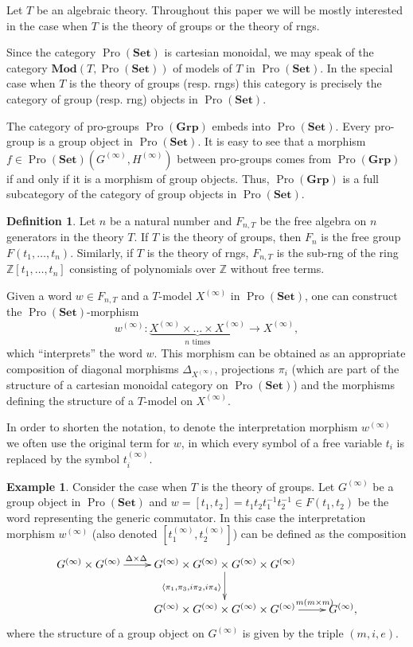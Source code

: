 \documentclass[oneside, 11pt]{amsart}
\numberwithin{equation}{section}
\theoremstyle{definition}
\newtheorem{df}[lemma]{Definition} \Crefname{df}{Definition}{Definitions}
\newtheorem{example}[lemma]{Example} \Crefname{example}{Example}{Examples}
\theoremstyle{remark}
\DeclareMathOperator{\Pro}{Pro}
\newcommand{\Set}{\mathbf{Set}}
\newcommand{\Group}{\mathbf{Grp}}
\newcommand{\Mod}{\mathbf{Mod}}
\begin{document}
Let $T$ be an algebraic theory. Throughout this paper we will be mostly interested in the case when $T$ is the theory of groups or the theory of rngs.

Since the category $\Pro(\Set)$ is cartesian monoidal, we may speak of the category $\Mod(T, \Pro(\Set))$ of models of $T$ in \(\Pro(\Set)\).
In the special case when $T$ is the theory of groups (resp. rngs) this category is precisely the category of group (resp. rng) objects in $\Pro(\Set)$.

The category of pro-groups \(\Pro(\Group)\) embeds into \(\Pro(\Set)\). Every pro-group is a group object in \(\Pro(\Set)\). It is easy to see that a morphism \(f \in \Pro(\Set)(G^{(\infty)}, H^{(\infty)})\) between pro-groups comes from \(\Pro(\Group)\) if and only if it is a morphism of group objects. Thus, $\Pro(\Group)$ is a full subcategory of the category of group objects in $\Pro(\Set)$.

\begin{df} \label{df-pro-set-morphisms} 
 Let $n$ be a natural number and $F_{n, T}$ be the free algebra on $n$ generators in the theory $T$.
 If $T$ is the theory of groups, then $F_n$ is the free group $F(t_1,\ldots, t_n)$.
 Similarly, if $T$ is the theory of rngs, $F_{n, T}$ is the sub-rng of the ring $\mathbb{Z}[t_1,\ldots, t_n]$ consisting of polynomials over $\mathbb{Z}$ without free terms.
 
 Given a word $w \in F_{n, T}$ and a $T$-model $X^{(\infty)}$ in $\Pro(\Set)$, one can construct the $\Pro(\Set)$-morphism
 \[ w^{(\infty)} \colon \underbrace{X^{(\infty)} \times \ldots \times X^{(\infty)}}_{n\text{ times}} \to X^{(\infty)}, \]
 which ``interprets'' the word $w$. This morphism can be obtained as an appropriate composition of diagonal morphisms $\Delta_{X^{(\infty)}}$, projections $\pi_i$ 
 (which are part of the structure of a cartesian monoidal category on $\Pro(\Set)$) 
 and the morphisms defining the structure of a $T$-model on $X^{(\infty)}$.
 
 In order to shorten the notation, to denote the interpretation morphism $w^{(\infty)}$ we often use the original term for $w$, in which every symbol of a free variable $t_i$ is replaced by the symbol $t_i^{(\infty)}$.
\end{df}

\begin{example}\label{example-commutator}
Consider the case when $T$ is the theory of groups.
Let $G^{(\infty)}$ be a group object in $\Pro(\Set)$ and $w = [t_1, t_2] = t_1 t_2 t_1^{-1} t_2^{-1} \in F(t_1, t_2)$ be the word representing the generic commutator.
In this case the interpretation morphism $w^{(\infty)}$ (also denoted $[t_1^{(\infty)}, t_2^{(\infty)}]$) can be defined as the composition
 \[ \xymatrix{G^{(\infty)} \times G^{(\infty)} \ar[r]^(.35){\Delta \times \Delta} & G^{(\infty)} \times G^{(\infty)} \times G^{(\infty)} \times G^{(\infty)} \ar[d]_{\langle \pi_1, \pi_3, i\pi_2, i\pi_4 \rangle} & \\
    & G^{(\infty)} \times G^{(\infty)} \times G^{(\infty)} \times G^{(\infty)} \ar[r]^(.76){m(m\times m)} & G^{(\infty)},} \]
where the structure of a group object on $G^{(\infty)}$ is given by the triple $(m, i, e)$.
\end{example}
\end{document}

